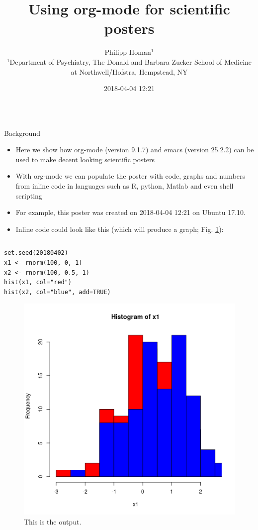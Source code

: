 \documentclass[final]{beamer}
\date{}
\author{
Philipp Homan$^{1}$
\\
\normalsize{$^{1}$Department of Psychiatry,}
\normalsize{The Donald and Barbara Zucker}
\normalsize{School of Medicine at Northwell/Hofstra,}
\normalsize{Hempstead, NY}
}
\date{2018-04-04 12:21}
\title{Using org-mode for scientific posters}
\begin{document}
\begin{frame}[fragile,label={sec:org954d466}]{}
 \begin{columns}
\begin{column}[t]{0.45\columnwidth}
\begin{block}{Background}
\begin{itemize}
\item Here we show how org-mode (version 
9.1.7) and emacs (version 
25.2.2) can be used to make decent looking scientific
posters
\item With org-mode we can populate the poster with code, graphs and numbers
from inline code in languages such as R, python, Matlab and even shell
scripting
\item For example, this poster was created on 2018-04-04 12:21 on
Ubuntu 17.10.
\item Inline code could look like this (which will produce a graph; 
Fig. \ref{fig:org8e3f41e}):
\end{itemize}

\begin{columns}
\begin{column}[T]{0.68\columnwidth}
\begin{verbatim}
set.seed(20180402)
x1 <- rnorm(100, 0, 1)
x2 <- rnorm(100, 0.5, 1)
hist(x1, col="red")
hist(x2, col="blue", add=TRUE)
\end{verbatim}

\begin{figure}[htbp]
\centering
\includegraphics[width=.9\linewidth]{3.png}
\caption{\label{fig:org8e3f41e}
This is the output.}
\end{figure}
\end{column}
\end{columns}
\end{block}


\end{column}
\end{columns}
\end{frame}
\end{document}
